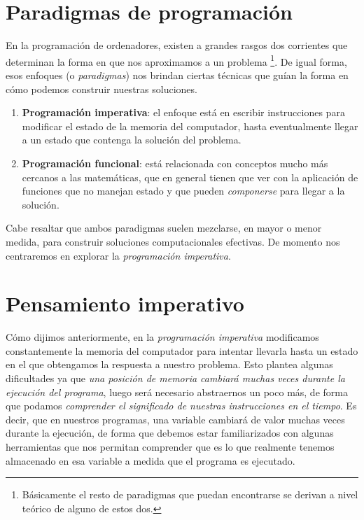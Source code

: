 \section{Paradigmas de programación}

En la programación de ordenadores, existen a grandes rasgos dos corrientes que determinan la forma en que nos aproximamos a un problema \footnote{Básicamente el resto de paradigmas que puedan encontrarse se derivan a nivel teórico de alguno de estos dos.}. De igual forma, esos enfoques (o \emph{paradigmas}) nos brindan ciertas técnicas que guían la forma en cómo podemos construir nuestras soluciones.

\begin{enumerate}
\item \textbf{Programación imperativa}: el enfoque está en escribir instrucciones para modificar el estado de la memoria del computador, hasta eventualmente llegar a un estado que contenga la solución del problema.

\item \textbf{Programación funcional}: está relacionada con conceptos mucho más cercanos a las matemáticas, que en general tienen que ver con la aplicación de funciones que no manejan estado y que pueden \emph{componerse} para llegar a la solución.
\end{enumerate}

Cabe resaltar que ambos paradigmas suelen mezclarse, en mayor o menor medida, para construir soluciones computacionales efectivas. De momento nos centraremos en explorar la \emph{programación imperativa}.

\section{Pensamiento imperativo}

Cómo dijimos anteriormente, en la \emph{programación imperativa} modificamos constantemente la memoria del computador para intentar llevarla hasta un estado en el que obtengamos la respuesta a nuestro problema. Esto plantea algunas dificultades ya que \emph{una posición de memoria cambiará muchas veces durante la ejecución del programa}, luego será necesario abstraernos un poco más, de forma que podamos \emph{comprender el significado de nuestras instrucciones en el tiempo}. Es decir, que en nuestros programas, una variable cambiará de valor muchas veces durante la ejecución, de forma que debemos estar familiarizados con algunas herramientas que nos permitan comprender que es lo que realmente tenemos almacenado en esa variable a medida que el programa es ejecutado.


